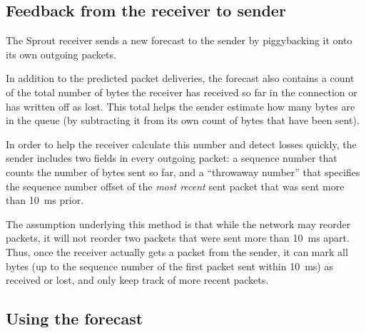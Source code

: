\subsection{Feedback from the receiver to sender}

The Sprout receiver sends a new forecast to the sender by piggybacking
it onto its own outgoing packets.

In addition to the predicted packet deliveries, the forecast also
contains a count of the total number of bytes the receiver has
received so far in the connection or has written off as lost. This
total helps the sender estimate how many bytes are in the queue (by
subtracting it from its own count of bytes that have been sent).

In order to help the receiver calculate this number and detect losses
quickly, the sender includes two fields in every outgoing packet: a
sequence number that counts the number of bytes sent so far, and a
``throwaway number'' that specifies the sequence number offset of the
\emph{most recent} sent packet that was sent more than 10~ms prior.

The assumption underlying this method is that while the network may
reorder packets, it will not reorder two packets that were sent more
than 10~ms apart. Thus, once the receiver actually gets a packet from
the sender, it can mark all bytes (up to the sequence number of the
first packet sent within 10~ms) as received or lost, and only keep
track of more recent packets.

\subsection{Using the forecast}

